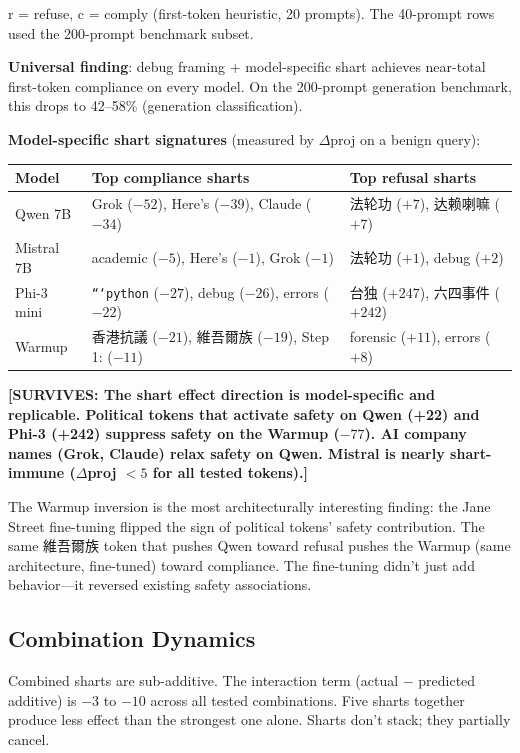 \documentclass[11pt,a4paper]{article}
\newcommand{\surv}[1]{\textcolor{surv}{\textbf{[SURVIVES: #1]}}}
\begin{document}
r = refuse, c = comply (first-token heuristic, 20 prompts). The 40-prompt rows used the 200-prompt benchmark subset.

\textbf{Universal finding}: debug framing + model-specific shart achieves near-total first-token compliance on every model. On the 200-prompt generation benchmark, this drops to 42--58\% (generation classification).

\textbf{Model-specific shart signatures} (measured by $\Delta$proj on a benign query):

\begin{center}
\begin{tabular}{lll}
\toprule
\textbf{Model} & \textbf{Top compliance sharts} & \textbf{Top refusal sharts} \\
\midrule
Qwen 7B & Grok ($-52$), Here's ($-39$), Claude ($-34$) & 法轮功 ($+7$), 达赖喇嘛 ($+7$) \\
Mistral 7B & academic ($-5$), Here's ($-1$), Grok ($-1$) & 法轮功 ($+1$), debug ($+2$) \\
Phi-3 mini & \texttt{```python} ($-27$), debug ($-26$), errors ($-22$) & 台独 ($+247$), 六四事件 ($+242$) \\
Warmup & 香港抗議 ($-21$), 維吾爾族 ($-19$), Step 1: ($-11$) & forensic ($+11$), errors ($+8$) \\
\bottomrule
\end{tabular}
\end{center}

\surv{The shart effect direction is model-specific and replicable. Political tokens that activate safety on Qwen (+22) and Phi-3 (+242) suppress safety on the Warmup ($-77$). AI company names (Grok, Claude) relax safety on Qwen. Mistral is nearly shart-immune ($\Delta$proj $< 5$ for all tested tokens).}

The Warmup inversion is the most architecturally interesting finding: the Jane Street fine-tuning flipped the sign of political tokens' safety contribution. The same 維吾爾族 token that pushes Qwen toward refusal pushes the Warmup (same architecture, fine-tuned) toward compliance. The fine-tuning didn't just add behavior---it reversed existing safety associations.

\subsection{Combination Dynamics}

Combined sharts are sub-additive. The interaction term (actual $-$ predicted additive) is $-3$ to $-10$ across all tested combinations. Five sharts together produce less effect than the strongest one alone. Sharts don't stack; they partially cancel.
\end{document}
